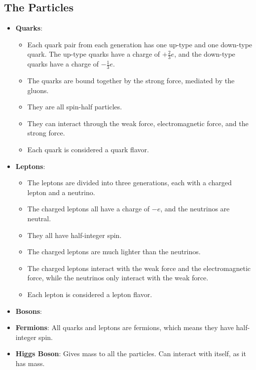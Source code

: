 \documentclass{article}
\begin{document}
\subsection{The Particles}
\begin{itemize}
    \item \textbf{Quarks}: 
    \begin{itemize}
        \item Each quark pair from each generation has one up-type and one down-type quark. The up-type quarks have a charge of $+\frac{2}{3}e$, and the down-type quarks have a charge of $-\frac{1}{3}e$. 
        \item The quarks are bound together by the strong force, mediated by the gluons. 
        \item They are all spin-half particles.
        \item They can interact through the weak force, electromagnetic force, and the strong force.
        \item Each quark is considered a quark flavor.
    \end{itemize}
    \item \textbf{Leptons}:
    \begin{itemize}
        \item The leptons are divided into three generations, each with a charged lepton and a neutrino.
        \item The charged leptons all have a charge of $-e$, and the neutrinos are neutral.
        \item They all have half-integer spin.
        \item The charged leptons are much lighter than the neutrinos. 
        \item The charged leptons interact with the weak force and the electromagnetic force, while the neutrinos only interact with the weak force.
        \item Each lepton is considered a lepton flavor.
    \end{itemize}
    \item \textbf{Bosons}:
    \item \textbf{Fermions}: All quarks and leptons are fermions, which means they have half-integer spin.
    \item \textbf{Higgs Boson}: Gives mass to all the particles. Can interact with itself, as it has mass. 
\end{itemize}
\end{document}
